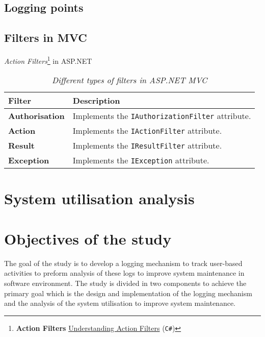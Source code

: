 \subsection{Logging points}\label{sec:Ch1_LoggignPoints}

\subsection{Filters in MVC}\label{sec:Ch1_FiltersMVC}

\emph{Action Filters}\cprotect\footnote{\textbf{Action Filters} \href{https://docs.microsoft.com/en-us/aspnet/mvc/overview/older-versions-1/controllers-and-routing/understanding-action-filters-cs}{Understanding Action Filters} (\verb|C#|)} in ASP.NET

\begin{table}[!htb]
	\centering
	\small
	\caption[Different types of filters in ASP.NET MVC]
	{\textit{Different types of filters in ASP.NET MVC}}
	\label{tbl:Ch1_ASPFilters}
	\begin{tabularx}{\textwidth}{|l|X|}
		\hline \textbf{Filter} & \textbf{Description} \\
		\hline \textbf{Authorisation} & Implements the \texttt{IAuthorizationFilter} attribute. \\
		\hline \textbf{Action} & Implements the \texttt{IActionFilter} attribute. \\
		\hline \textbf{Result} & Implements the \texttt{IResultFilter} attribute. \\
		\hline \textbf{Exception} & Implements the \texttt{IException} attribute. \\
		\hline
	\end{tabularx}
\end{table}

\clearpage

\section{System utilisation analysis}\label{sec:SystemUtilisation}

\clearpage

\section{Objectives of the study}
The goal of the study is to develop a logging mechanism to track user-based
activities to preform analysis of these logs to improve system maintenance in
software environment. The study is divided in two components to achieve the
primary goal which is the design and implementation of the logging mechanism
and the analysis of the system utilisation to improve system maintenance.

